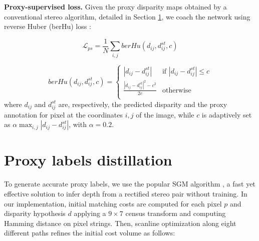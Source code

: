 \documentclass[10pt,twocolumn,letterpaper]{article}
\begin{document}
\textbf{Proxy-supervised loss.}
Given the proxy disparity maps obtained by a conventional stereo algorithm, detailed in Section \ref{sec:distillation}, we coach the network using reverse Huber (berHu) loss \cite{owen2007robust}: 

\begin{equation}\label{eq:semisupervised}
\mathcal{L}_{ps} = \frac{1}{N} \sum_{i,j} berHu(d_{ij},d_{ij}^{st}, c)
\end{equation}

\begin{equation}\label{eq:berhu}
    berHu(d_{ij},d_{ij}^{st},c)=
\begin{cases}
|d_{ij}-d_{ij}^{st}| & \text{if } |d_{ij}-d_{ij}^{st}|\leq c \\
\frac{|d_{ij}-d_{ij}^{st}|^2 - c^2}{2c} & \text{otherwise } \\
\end{cases}
\end{equation} 
where $d_{ij}$ and $d_{ij}^{st}$ are, respectively, the predicted disparity and the proxy annotation for pixel at the coordinates $i,j$ of the image, while $c$ is adaptively set as $\alpha \max_{i,j}|d_{ij}-d_{ij}^{st}|$, with $\alpha = 0.2$.




\smallskip
\section{Proxy labels distillation}\label{sec:distillation}

To generate accurate proxy labels, we use the popular SGM algorithm \cite{hirschmuller2005accurate}, a fast yet effective solution to infer depth from a rectified stereo pair without training. 
In our implementation, initial matching costs are computed for each pixel $p$ and disparity hypothesis $d$ applying a $9\times7$ census transform and computing Hamming distance on pixel strings. Then, scanline optimization along eight different paths refines the initial cost volume as follows: 
\end{document}
